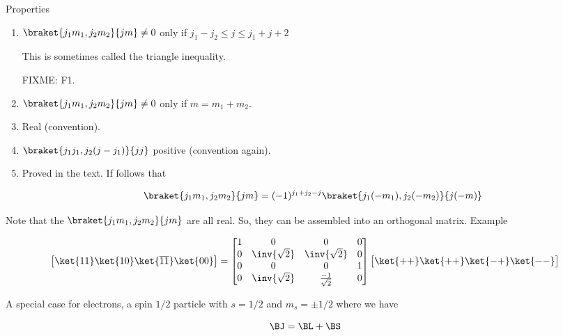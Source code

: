 Properties
\begin{enumerate}
\item $\braket{ j_1 m_1, j_2 m_2 }{ jm } \ne 0$ only if $j_1 - j_2 \le j \le j_1 + j+2$

This is sometimes called the triangle inequality.

FIXME: F1.

\item $\braket{ j_1 m_1, j_2 m_2 }{ jm } \ne 0$ only if $m = m_1 + m_2$.

\item Real (convention).

\item $\braket{ j_1 j_1, j_2 (j - j_1) }{ j j }$ positive (convention again).

\item Proved in the text.  If follows that 

\begin{equation}\label{eqn:qmTwoL18:n}
\braket{ j_1 m_1, j_2 m_2 }{ j m }
=
(-1)^{j_1 + j_2 - j}
\braket{ j_1 (-m_1), j_2 (-m_2) }{ j (-m) }
\end{equation}
\end{enumerate}

Note that the $\braket{ j_1 m_1, j_2 m_2 }{ j m }$ are all real.  So, they can be assembled into an orthogonal matrix.  Example

\begin{equation}\label{eqn:qmTwoL18:n}
\begin{bmatrix}
\ket{11}
\ket{10}
\ket{\overline{11}}
\ket{00}
\end{bmatrix}
=
\begin{bmatrix}
1 & 0 & 0 & 0 \\
0 & \inv{\sqrt{2}} & \inv{\sqrt{2}} & 0 \\
0 & 0 & 0 & 1 \\
0 & \inv{\sqrt{2}} & \frac{-1}{\sqrt{2}} & 0 \\
\end{bmatrix}
\begin{bmatrix}
\ket{++}
\ket{++}
\ket{-+}
\ket{--}
\end{bmatrix}
\end{equation}

A special case for electrons, a spin $1/2$ particle with $s = 1/2$ and $m_s = \pm 1/2$ where we have 

\begin{equation}\label{eqn:qmTwoL18:n}
\BJ = \BL + \BS
\end{equation}


